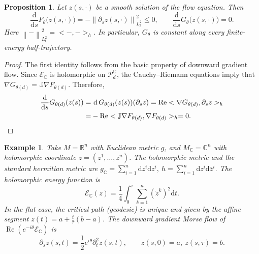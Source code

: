 \documentclass[11pt]{amsart}
\theoremstyle{plain}
\newtheorem{prop}[thm]{Proposition}
\newtheorem{eg}[thm]{Example}
\theoremstyle{definition}
\newcommand{\R}{\mathbb{R}}
\newcommand{\C}{\mathbb{C}}
\newcommand{\dd}{\mathrm d}
\newcommand{\norm}[1]{\left\lVert #1\right\rVert}
\newcommand{\PP}{\mathcal{P}}
\DeclareMathOperator{\re}{Re}
\begin{document}
\begin{prop}\label{prop:FG}
Let $z(s,\cdot)$ be a smooth solution of the flow equation. Then
\begin{equation}\label{eq:Fdecrease}
\frac{\dd}{\dd s}F_{\theta}\bigl(z(s,\cdot)\bigr)
=-\norm{\partial_s z(s,\cdot)}_{L^2_t}^2\le 0,
\qquad
\frac{\dd}{\dd s}G_{\theta}\bigl(z(s,\cdot)\bigr)=0.
\end{equation}
Here $\norm{- }_{L^2_t}^2=<-,->_{h}$. In particular, $G_{\theta}$ is constant along every finite-energy half-trajectory.
\end{prop}

\begin{proof}
The first identity follows from the basic property of downward gradient flow. Since $\mathcal E_{\C}$ is holomorphic on $\PP_d^{\C}$, the Cauchy--Riemann equations imply that $\nabla G_{\theta(d)}=\mathbb J\nabla F_{\theta(d)}$. Therefore,
\begin{align*}
\frac{\dd}{\dd s}G_{\theta(d)}(z(s))
=&~\dd\,G_{\theta(d)}(z(s))(\partial_s z)
=\re<\nabla G_{\theta(d)},\partial_s z>_h\\
=&-\re<\mathbb J\nabla F_{\theta(d)},\nabla F_{\theta(d)}>_h=0.\qedhere
\end{align*}
\end{proof}


\begin{eg}
Take $M=\R^n$ with Euclidean metric $g$, and $M_{\C}=\C^n$ with holomorphic coordinate $z=(z^1,\ldots,z^n)$. The holomorphic metric and the standard hermitian metric are 
$g_{\C}=\sum\limits_{i=1}^n\dd z^i \dd z^i,\ h=\sum\limits_{i=1}^n\dd z^i \dd \bar{z}^i$. The holomorphic energy function is 
\[\mathcal E_{\C}(z)=\frac{1}{4}\int_0^{\tau}\sum_{k=1}^n\left(\dot{z}^k\right)^2\dd t.\]
In the flat case, the critical path (geodesic) is unique and given by the affine segment
$z(t)=a+\frac{t}{\tau}(b-a)$. The downward gradient Morse flow of $ \re(e^{-i\theta}\mathcal E_\C)$ is 
\[\partial_s z(s,t)=\frac{1}{2}e^{i\theta}\partial_t^2 \bar{z}(s,t),\qquad z(s,0)=a,~ z(s,\tau)=b.\]
\end{eg}
\end{document}
